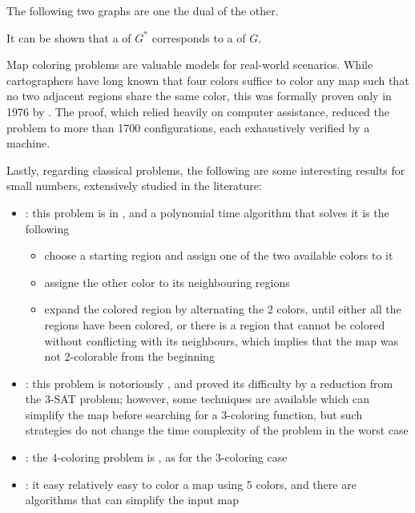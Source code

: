 \documentclass[a4paper, 12pt]{report}
\begin{document}
    \begin{example}
        The following two graphs are one the dual of the other.

    \end{example}

    It can be shown that a  of $G^*$ corresponds to a  of $G$.

    Map coloring problems are valuable models for real-world scenarios. While cartographers have long known that four colors suffice to color any map such that no two adjacent regions share the same color, this was formally proven only in 1976 by \textcite{appel}. The proof, which relied heavily on computer assistance, reduced the problem to more than 1700 configurations, each exhaustively verified by a machine.

    Lastly, regarding classical  problems, the following are some interesting results for small numbers, extensively studied in the literature:

    \begin{itemize}
        \item {}: this problem is in \Pclass, and a polynomial time algorithm that solves it is the following
            \begin{itemize}
                \item choose a starting region and assign one of the two available colors to it
                \item assigne the other color to its neighbouring regions
                \item expand the colored region by alternating the 2 colors, until either all the regions have been colored, or there is a region that cannot be colored without conflicting with its neighbours, which implies that the map was not 2-colorable from the beginning
            \end{itemize}
        \item {}: this problem is notoriously \NPHard, and \textcite{karp} proved its difficulty by a reduction from the 3-SAT problem; however, some techniques are available which can simplify the map before searching for a 3-coloring function, but such strategies do not change the time complexity of the problem in the worst case
        \item {}: the 4-coloring problem is \NPComplete, as for the 3-coloring case
        \item {}: it easy relatively easy to color a map using 5 colors, and there are algorithms that can simplify the input map
    \end{itemize}
\end{document}
